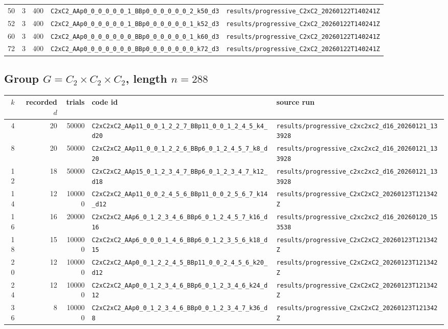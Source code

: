 \documentclass[11pt]{article}
\begin{document}
\begin{longtable}{@{}r r r l l@{}}
50 & 3 & 400 & \texttt{C2xC2\_AAp0\_0\_0\_0\_0\_0\_1\_BBp0\_0\_0\_0\_0\_0\_2\_k50\_d3} & \texttt{results/progressive\_C2xC2\_20260122T140241Z} \\
52 & 3 & 400 & \texttt{C2xC2\_AAp0\_0\_0\_0\_0\_0\_1\_BBp0\_0\_0\_0\_0\_0\_1\_k52\_d3} & \texttt{results/progressive\_C2xC2\_20260122T140241Z} \\
60 & 3 & 400 & \texttt{C2xC2\_AAp0\_0\_0\_0\_0\_0\_0\_BBp0\_0\_0\_0\_0\_0\_1\_k60\_d3} & \texttt{results/progressive\_C2xC2\_20260122T140241Z} \\
72 & 3 & 400 & \texttt{C2xC2\_AAp0\_0\_0\_0\_0\_0\_0\_BBp0\_0\_0\_0\_0\_0\_0\_k72\_d3} & \texttt{results/progressive\_C2xC2\_20260122T140241Z} \\
\bottomrule
\end{longtable}

\subsection{Group $G = C_{2} \times C_{2} \times C_{2}$, length $n=288$}

\begin{longtable}{@{}r r r l l@{}}
\toprule
$k$ & recorded $d$ & trials & code id & source run \\
\midrule
\endhead
4 & 20 & 50000 & \texttt{C2xC2xC2\_AAp11\_0\_0\_1\_2\_2\_7\_BBp11\_0\_0\_1\_2\_4\_5\_k4\_d20} & \texttt{results/progressive\_c2xc2xc2\_d16\_20260121\_133928} \\
8 & 20 & 50000 & \texttt{C2xC2xC2\_AAp11\_0\_0\_1\_2\_2\_6\_BBp6\_0\_1\_2\_4\_5\_7\_k8\_d20} & \texttt{results/progressive\_c2xc2xc2\_d16\_20260121\_133928} \\
12 & 18 & 50000 & \texttt{C2xC2xC2\_AAp15\_0\_1\_2\_3\_4\_7\_BBp6\_0\_1\_2\_3\_4\_7\_k12\_d18} & \texttt{results/progressive\_c2xc2xc2\_d16\_20260121\_133928} \\
14 & 12 & 100000 & \texttt{C2xC2xC2\_AAp11\_0\_0\_2\_4\_5\_6\_BBp11\_0\_0\_2\_5\_6\_7\_k14\_d12} & \texttt{results/progressive\_C2xC2xC2\_20260123T121342Z} \\
16 & 16 & 20000 & \texttt{C2xC2xC2\_AAp6\_0\_1\_2\_3\_4\_6\_BBp6\_0\_1\_2\_4\_5\_7\_k16\_d16} & \texttt{results/progressive\_c2xc2xc2\_d16\_20260120\_153538} \\
18 & 15 & 100000 & \texttt{C2xC2xC2\_AAp6\_0\_0\_0\_1\_4\_6\_BBp6\_0\_1\_2\_3\_5\_6\_k18\_d15} & \texttt{results/progressive\_C2xC2xC2\_20260123T121342Z} \\
20 & 12 & 100000 & \texttt{C2xC2xC2\_AAp0\_0\_1\_2\_2\_4\_5\_BBp11\_0\_0\_2\_4\_5\_6\_k20\_d12} & \texttt{results/progressive\_C2xC2xC2\_20260123T121342Z} \\
24 & 12 & 100000 & \texttt{C2xC2xC2\_AAp0\_0\_1\_2\_3\_4\_6\_BBp6\_0\_1\_2\_3\_4\_6\_k24\_d12} & \texttt{results/progressive\_C2xC2xC2\_20260123T121342Z} \\
36 & 8 & 100000 & \texttt{C2xC2xC2\_AAp0\_0\_1\_2\_3\_4\_6\_BBp0\_0\_1\_2\_3\_4\_7\_k36\_d8} & \texttt{results/progressive\_C2xC2xC2\_20260123T121342Z} \\
\bottomrule
\end{longtable}
\end{document}
